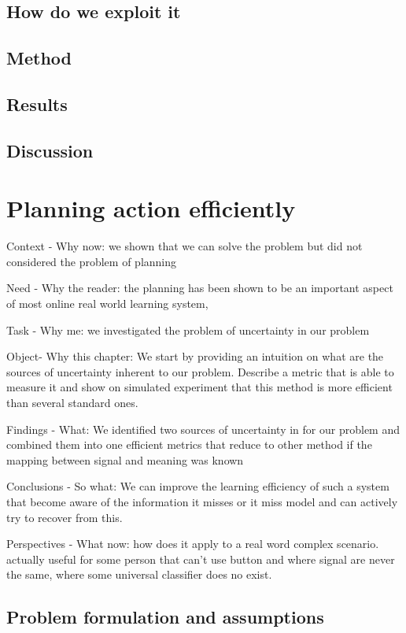 \section{How do we exploit it}

\section{Method}

\section{Results}

\section{Discussion}

\chapter{Planning action efficiently}
\minitoc

Context - Why now: we shown that we can solve the problem but did not considered the problem of planning

Need - Why the reader: the planning has been shown to be an important aspect of most online real world learning system, 

Task - Why me: we investigated the problem of uncertainty in our problem

Object- Why this chapter: We start by providing an intuition on what are the sources of uncertainty inherent to our problem. Describe a metric that is able to measure it and show on simulated experiment that this method is more efficient than several standard ones.

Findings - What: We identified two sources of uncertainty in for our problem and combined them into one efficient metrics that reduce to other method if the mapping between signal and meaning was known

Conclusions - So what: We can improve the learning efficiency of such a system that become aware of the information it misses or it miss model and can actively try to recover from this.

Perspectives - What now: how does it apply to a real word complex scenario. actually useful for some person that can't use button and where signal are never the same, where some universal classifier does no exist.

\section{Problem formulation and assumptions}

